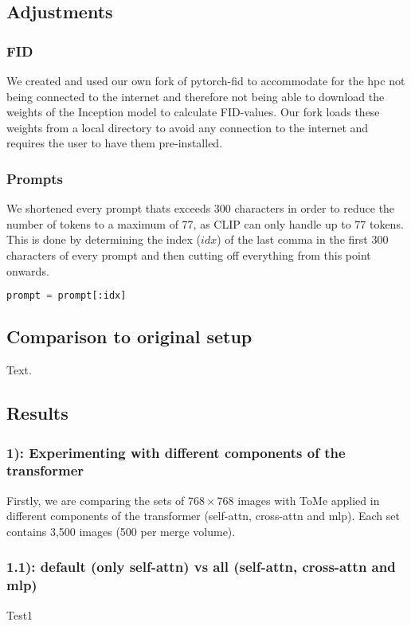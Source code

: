 \subsection{Adjustments}
\subsubsection*{FID}
We created and used our own fork of pytorch-fid\cite{Seitzer2020FID} to accommodate for the hpc not being connected to the internet and therefore not being able to download the weights of the Inception model to calculate FID-values. Our fork loads these weights from a local directory to avoid any connection to the internet and requires the user to have them pre-installed.

\subsubsection*{Prompts}
We shortened every prompt thats exceeds 300 characters in order to reduce the number of tokens to a maximum of 77, as CLIP\cite{radford2021learning} can only handle up to 77 tokens.\\
This is done by determining the index (\(idx\)) of the last comma in the first 300 characters of every prompt and then cutting off everything from this point onwards.
\begin{lstlisting}[language=Python]
prompt = prompt[:idx]
\end{lstlisting}

\subsection{Comparison to original setup}
Text.

\subsection{Results}
\subsubsection*{1): Experimenting with different components of the transformer}
Firstly, we are comparing the sets of $768 \times 768$ images with ToMe applied in different components of the transformer (self-attn, cross-attn and mlp). Each set contains 3,500 images (500 per merge volume).

\newpage
\subsubsection*{1.1): default (only self-attn) vs all (self-attn, cross-attn and mlp)}
\begin{figure}[!htb]
   
   
\end{figure}
%
Test1

